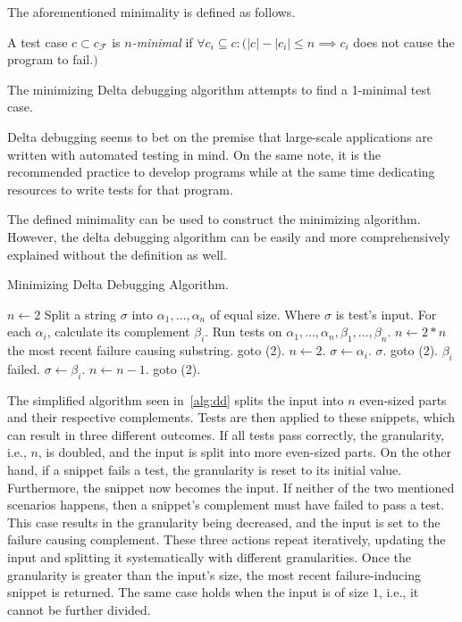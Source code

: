 The aforementioned minimality is defined as follows.

\begin{defn}[$n$-minimality]\label{def02:4}
  A test case $c \subset c_\mathcal{F}$ is \emph{$n$-minimal}
  if $\forall c_i \subseteq c:
  (|c| - |c_i| \leq n \implies c_i$ does not cause the program to fail.$)$
\end{defn}

The minimizing Delta debugging algorithm attempts to find a 1-minimal test case.

Delta debugging seems to bet on the premise that large-scale applications are written
with automated testing in mind. On the same note, it is the recommended practice to
develop programs while at the same time dedicating resources to write tests for that
program.

The defined minimality can be used to construct the minimizing algorithm. 
However, the delta debugging algorithm can be easily and more comprehensively explained 
without the definition as well.


\begin{algorithm}
	\label{alg:dd}
	\caption{Minimizing Delta Debugging Algorithm.} 
	\begin{algorithmic}[1]
		\State $n \leftarrow 2$
		\State Split a string $\sigma$ into $\alpha_1,\dots,\alpha_n$ of equal size.
		\Comment Where $\sigma$ is test's input.
		\State For each $\alpha_i$, calculate its complement $\beta_i$.
		\State Run tests on $\alpha_1,\dots,\alpha_n,\beta_1,\dots,\beta_n$.
			\State $n \leftarrow 2*n$
				\Return the most recent failure causing substring.
			\Else
				\State goto (2).
			\EndIf
			\State $n \leftarrow 2$.
			\State $\sigma \leftarrow \alpha_i$.
				\Return $\sigma$.
			\Else
				\State goto (2).
			\EndIf
		\Else
			\Comment $\beta_i$ failed.
			\State $\sigma \leftarrow \beta_i$.
			\State $n \leftarrow n - 1$.
			\State goto (2).
		\EndIf
	\end{algorithmic} 
\end{algorithm}

The simplified algorithm seen in~\ref{alg:dd} splits the input into $n$ even-sized
parts and their respective complements. 
Tests are then applied to these snippets, which can result in three different outcomes. 
If all tests pass correctly, the granularity, i.e., $n$, is doubled, and the input is split
into more even-sized parts. 
On the other hand, if a snippet fails a test, the granularity is reset to its initial value.
Furthermore, the snippet now becomes the input. 
If neither of the two mentioned scenarios happens, 
then a snippet's complement must have failed to pass a test. 
This case results in the granularity being decreased, 
and the input is set to the failure causing complement.
These three actions repeat iteratively, updating the input and 
splitting it systematically with different granularities. 
Once the granularity is greater than the input's size, 
the most recent failure-inducing snippet is returned. 
The same case holds when the input is of size $1$, i.e., it cannot be further divided.

